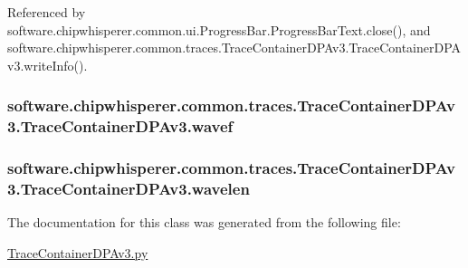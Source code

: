 Referenced by software.\+chipwhisperer.\+common.\+ui.\+Progress\+Bar.\+Progress\+Bar\+Text.\+close(), and software.\+chipwhisperer.\+common.\+traces.\+Trace\+Container\+D\+P\+Av3.\+Trace\+Container\+D\+P\+Av3.\+write\+Info().

\hypertarget{classsoftware_1_1chipwhisperer_1_1common_1_1traces_1_1TraceContainerDPAv3_1_1TraceContainerDPAv3_a86338434e4b8395f6c11fb46f2c18562}{}
\subsubsection[{wavef}]{\setlength{\rightskip}{0pt plus 5cm}software.\+chipwhisperer.\+common.\+traces.\+Trace\+Container\+D\+P\+Av3.\+Trace\+Container\+D\+P\+Av3.\+wavef}\label{classsoftware_1_1chipwhisperer_1_1common_1_1traces_1_1TraceContainerDPAv3_1_1TraceContainerDPAv3_a86338434e4b8395f6c11fb46f2c18562}
\hypertarget{classsoftware_1_1chipwhisperer_1_1common_1_1traces_1_1TraceContainerDPAv3_1_1TraceContainerDPAv3_adfcb990145271d0ac9029d335dc38bc7}{}
\subsubsection[{wavelen}]{\setlength{\rightskip}{0pt plus 5cm}software.\+chipwhisperer.\+common.\+traces.\+Trace\+Container\+D\+P\+Av3.\+Trace\+Container\+D\+P\+Av3.\+wavelen}\label{classsoftware_1_1chipwhisperer_1_1common_1_1traces_1_1TraceContainerDPAv3_1_1TraceContainerDPAv3_adfcb990145271d0ac9029d335dc38bc7}


The documentation for this class was generated from the following file\+:\begin{DoxyCompactItemize}
\item 
\hyperlink{TraceContainerDPAv3_8py}{Trace\+Container\+D\+P\+Av3.\+py}\end{DoxyCompactItemize}
